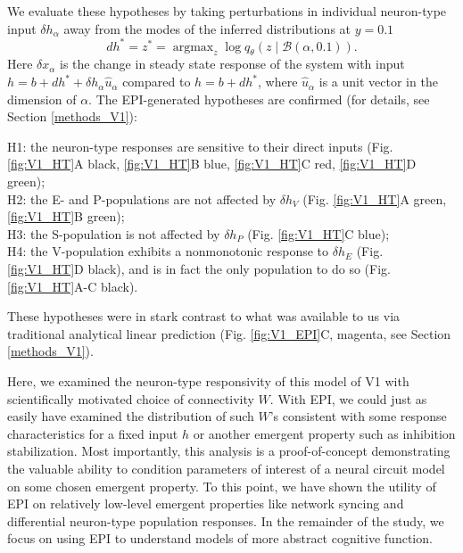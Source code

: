 \documentclass[11pt]{article}
\DeclareMathOperator*{\argmax}{argmax}
\begin{document}
We evaluate these hypotheses by taking perturbations in individual neuron-type input $\delta h_\alpha$ away from the modes of the inferred distributions at $y=0.1$
\begin{equation}
dh^* = z^* = \argmax_{z} \log q_\theta(z \mid \mathcal{B}(\alpha, 0.1)).
\end{equation}
Here $\delta x_{\alpha}$ is the change in steady state response of the system with input $h = b + dh^* + \delta h_\alpha \hat{u}_\alpha$ compared to $h = b + dh^*$, where $\hat{u}_\alpha$ is a unit vector in the dimension of $\alpha$. The EPI-generated  hypotheses are confirmed (for details, see Section \ref{methods_V1}): 

{\addtolength{\leftskip}{10 mm}
H1: the neuron-type responses are sensitive to their direct inputs (Fig. \ref{fig:V1_HT}A black, \ref{fig:V1_HT}B blue, \ref{fig:V1_HT}C red, \ref{fig:V1_HT}D green); \\
H2: the E- and P-populations are not affected by $\delta h_V$ (Fig. \ref{fig:V1_HT}A green, \ref{fig:V1_HT}B green); \\
H3: the S-population is not affected by $\delta h_P$ (Fig. \ref{fig:V1_HT}C blue); \\
H4: the V-population exhibits a nonmonotonic response to $\delta h_E$ (Fig. \ref{fig:V1_HT}D black), and is in fact the only population to do so (Fig. \ref{fig:V1_HT}A-C black).

}

These hypotheses were in stark contrast to what was available to us via traditional analytical linear prediction (Fig. \ref{fig:V1_EPI}C, magenta, see Section \ref{methods_V1}).

Here, we examined the neuron-type responsivity of this model of V1 with scientifically motivated choice of connectivity $W$.
With EPI, we could just as easily have examined the distribution of such $W$'s consistent with some response characteristics for a fixed input $h$ or another emergent property such as inhibition stabilization.
Most importantly, this analysis is a proof-of-concept demonstrating the valuable ability to condition parameters of interest of a neural circuit model on some chosen emergent property.
To this point, we have shown the utility of EPI on relatively low-level emergent properties like network syncing and differential neuron-type population responses.  
In the remainder of the study, we focus on using EPI to understand models of more abstract cognitive function.

\end{document}

